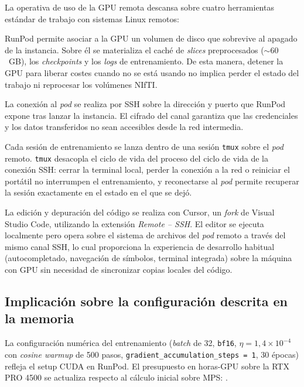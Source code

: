 La operativa de uso de la GPU remota descansa sobre cuatro
herramientas estándar de trabajo con sistemas Linux remotos:

\begin{description}[leftmargin=*]
    \item[Volumen de almacenamiento persistente.] RunPod permite
    asociar a la GPU un volumen de disco que sobrevive al
    apagado de la instancia. Sobre él se materializa el caché
    de \textit{slices} preprocesados ($\sim 60$~GB), los
    \textit{checkpoints} y los \textit{logs} de entrenamiento.
    De esta manera, detener la GPU para liberar costes cuando
    no se está usando no implica perder el estado del trabajo
    ni reprocesar los volúmenes NIfTI.
    \item[SSH.] La conexión al \textit{pod} se realiza por SSH
    sobre la dirección y puerto que RunPod expone tras lanzar la
    instancia. El cifrado del canal garantiza que las
    credenciales y los datos transferidos no sean accesibles
    desde la red intermedia.
    \item[\texttt{tmux}.] Cada sesión de entrenamiento se lanza
    dentro de una sesión \texttt{tmux} sobre el \textit{pod}
    remoto. \texttt{tmux} desacopla el ciclo de vida del proceso
    del ciclo de vida de la conexión SSH: cerrar la terminal
    local, perder la conexión a la red o reiniciar el portátil
    no interrumpen el entrenamiento, y reconectarse al
    \textit{pod} permite recuperar la sesión exactamente en el
    estado en el que se dejó.
    \item[Cursor / VSCode con Remote-SSH.] La edición y
    depuración del código se realiza con Cursor, un \textit{fork}
    de Visual Studio Code, utilizando la extensión \textit{Remote
    -- SSH}. El editor se ejecuta localmente pero opera sobre el
    sistema de archivos del \textit{pod} remoto a través del
    mismo canal SSH, lo cual proporciona la experiencia de
    desarrollo habitual (autocompletado, navegación de símbolos,
    terminal integrada) sobre la máquina con GPU sin necesidad
    de sincronizar copias locales del código.
\end{description}

\subsection{Implicación sobre la configuración descrita en la memoria}

La configuración numérica del entrenamiento (\textit{batch} de 32,
\texttt{bf16}, $\eta = 1{,}4 \times 10^{-4}$ con \textit{cosine
warmup} de 500 pasos, \texttt{gradient\_accumulation\_steps = 1},
30 épocas) refleja el setup CUDA en RunPod. El presupuesto en
horas-GPU sobre la RTX PRO 4500 se actualiza respecto al cálculo
inicial sobre MPS: .


